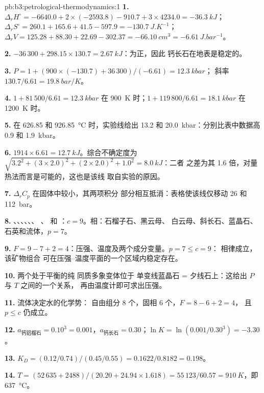\begin{solution}{pb:b3:petrological-thermodynamics:1}
\textbf{1.} $\Delta_rH^\circ = -6640.0 + 2\times(-2593.8) - 910.7 + 3\times4234.0
= \qty{-36.3}{kJ}$；$\Delta_rS^\circ = 260.1 + 165.6 + 41.5 - 597.9 =
\qty{-130.7}{J.K^{-1}}$；$\Delta_rV = 125.28 + 88.30 + 22.69 - 302.37 =
\qty{-66.10}{cm^3} = \qty{-6.61}{J.bar^{-1}}$。

\textbf{2.} $-36\,300 + 298.15\times130.7 = \qty{+2.67}{kJ}$：为正，因此
钙长石在地表是稳定的。

\textbf{3.} $P = 1 + (900\times(-130.7) + 36\,300)/(-6.61) = \qty{12.3}{kbar}$；
斜率 $130.7/6.61 = \qty{19.8}{bar/K}$。

\textbf{4.} $1 + 81\,500/6.61 = \qty{12.3}{kbar}$ 在 \qty{900}{K} 时；$1 +
119\,800/6.61 = \qty{18.1}{kbar}$ 在 \qty{1200}{K} 时。

\textbf{5.} 在 626.85 和 \qty{926.85}{\celsius} 时，实验线给出
13.2 和 \qty{20.0}{kbar}：分别比表中数据高 0.9 和 \qty{1.9}{kbar}。

\textbf{6.} $1914\times6.61 = \qty{12.7}{kJ}$。综合不确定度为
$\sqrt{3.2^2 + (3\times2.0)^2 + (2\times2.0)^2 + 1.0^2} = \qty{8.0}{kJ}$：二者
之差为其 1.6 倍，对量热法而言是可能的，这也是该线
取自实验的原因。

\textbf{7.} $\Delta_rC_p$ 在固体中较小，其两项积分
部分相互抵消：表格使该线仅移动 26 和 \qty{112}{bar}。

\textbf{8.} 、、、、、、
、 和 ：$c = 9$。相：石榴子石、黑云母、
白云母、斜长石、蓝晶石、石英和流体，$p = 7$。

\textbf{9.} $F = 9 - 7 + 2 = 4$：压强、温度及两个成分变量。$p = 7 \le c = 9$：
相律成立，该矿物组合
可在压强–温度平面的一个区域内稳定存在。

\textbf{10.} 两个处于平衡的纯  同质多象变体位于
单变线蓝晶石 = 夕线石上：这给出 $P$ 与 $T$ 之间的一个关系，
再由温度计即可求出压强。

\textbf{11.} 流体决定水的化学势：
自由组分 8 个，固相 6 个，$F = 8 - 6 + 2 = 4$，
且 $p \le c$ 仍成立。

\textbf{12.} $a_{\text{钙铝榴石}} = 0.10^3 = 0.001$，$a_{\text{钙长石}} =
0.30$；$\ln K = \ln(0.001/0.30^3) = -3.30$。

\textbf{13.} $K_D = (0.12/0.74)/(0.45/0.55) = 0.1622/0.8182 = 0.198$。

\textbf{14.} $T = (52\,635 + 2488)/(20.20 + 24.94\times1.618) = 55\,123/60.57
= \qty{910}{K}$，即 \qty{637}{\celsius}。


\end{solution}
